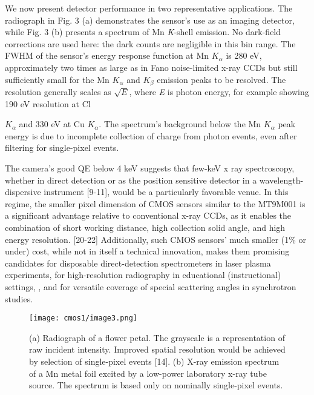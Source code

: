 We now present detector performance in two representative applications.
The radiograph in Fig. 3 (a) demonstrates the sensor's use as an imaging
detector, while Fig. 3 (b) presents a spectrum of Mn \emph{K}-shell
emission. No dark-field corrections are used here: the dark counts are
negligible in this bin range. The FWHM of the sensor's energy response
function at Mn \(K_{\alpha}\) is 280 eV, approximately two times as
large as in Fano noise-limited x-ray CCDs but still sufficiently small
for the Mn \(K_{\alpha}\) and \(K_{\beta}\) emission peaks to be
resolved. The resolution generally scales as \(\sqrt{E}\), where
\emph{E} is photon energy, for example showing 190 eV resolution at Cl
\(K_{\alpha}\)
and 330 eV at Cu \(K_{\alpha}\). The spectrum's background below the Mn
\(K_{\alpha}\) peak energy is due to incomplete collection of charge
from photon events, even after filtering for single-pixel events.

The camera's good QE below 4 keV suggests that few-keV x ray
spectroscopy, whether in direct detection or as the position sensitive
detector in a wavelength-dispersive
instrument {[}9-11{]}, would be a
particularly favorable venue. In this regime, the smaller pixel
dimension of CMOS sensors similar to the MT9M001 is a significant
advantage relative to conventional x-ray CCDs, as it enables the
combination of short working distance, high collection solid angle, and
high energy
resolution.
 {[}20-22{]} Additionally, such
CMOS sensors' much smaller (1\% or under) cost, while not in itself a
technical innovation, makes them promising candidates for disposable
direct-detection spectrometers in laser plasma experiments, for
high-resolution radiography in educational (instructional) settings, ,
and for versatile coverage of special scattering angles in synchrotron
studies.

\begin{figure}[h] \label{cm1image3}
\caption{ (a) Radiograph of a flower petal. The grayscale is a
representation of raw incident intensity. Improved spatial resolution
would be achieved by selection of single-pixel
events {[}14{]}. (b) X-ray
emission spectrum of a Mn metal foil excited by a low-power laboratory
x-ray tube source. The spectrum is based only on nominally single-pixel
events.}
\centering
\texttt{[image: cmos1/image3.png]}
\end{figure}

\FloatBarrier


